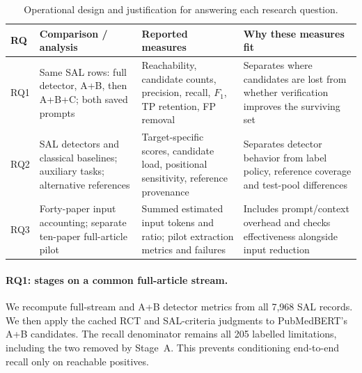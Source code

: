 \begin{table}[t]
\centering\small
\caption{Operational design and justification for answering each research question.}
\label{T:rq-design}
\begin{tabularx}{\linewidth}{@{}p{1cm}YYY@{}}
\toprule
RQ & Comparison / analysis & Reported measures & Why these measures fit \\
\midrule
RQ1 & Same SAL rows: full detector, A+B, then A+B+C; both saved prompts & Reachability, candidate counts, precision, recall, $F_1$, TP retention, FP removal & Separates where candidates are lost from whether verification improves the surviving set \\
RQ2 & SAL detectors and classical baselines; auxiliary tasks; alternative references & Target-specific scores, candidate load, positional sensitivity, reference provenance & Separates detector behavior from label policy, reference coverage and test-pool differences \\
RQ3 & Forty-paper input accounting; separate ten-paper full-article pilot & Summed estimated input tokens and ratio; pilot extraction metrics and failures & Includes prompt/context overhead and checks effectiveness alongside input reduction \\
\bottomrule
\end{tabularx}
\end{table}

\paragraph{RQ1: stages on a common full-article stream.}
We recompute full-stream and A+B detector metrics from all 7,968 SAL records. We then apply the
cached RCT and SAL-criteria judgments to PubMedBERT's A+B candidates. The recall denominator remains
all 205 labelled limitations, including the two removed by Stage~A. This prevents conditioning
end-to-end recall only on reachable positives.

